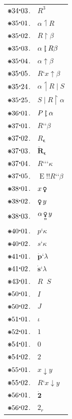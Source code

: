 \documentclass[12pt,openany,leqno,twocolumn]{book}
\newcommand{\pmast}{\text{\resizebox{!}{.75\height}{\ding{107}}}} %
\newcommand{\pmcdot}{\text{\raisebox{.05cm}{$\boldsymbol\cdot$}}} %
\newcommand{\pmbreve}[1]{\mathbf{\breve{\text{$#1$}}}}
\newcommand{\pmcirc}[1]{\mathbf{\dot{\text{$#1$}}}}
\newcommand{\pmshr}{\textbf{!}} %
\newcommand{\pmcin}{\mathop{\boldsymbol{\epsilon}}} %
\newcommand{\pmdscf}[2]{#1\textbf{`}#2} %
\newcommand{\pmcrel}[1]{\pmbreve{#1}} %
\newcommand{\pmrprd}[2]{{#1}\mathop{|}{#2}} %
\newcommand{\pmrprdn}[2]{#1^{#2}} %
\newcommand{\pmrld}[2]{#1 \boldsymbol{\upharpoonleft} #2} %
\newcommand{\pmrlcd}[2]{#1 \boldsymbol{\upharpoonright} #2} %
\newcommand{\pmrl}[2]{#1 \boldsymbol{\uparrow} #2} %
\newcommand{\pmrlf}[2]{#1 \mathbin{\ooalign{$\upharpoonright$\cr\hidewidth\rotatebox[origin=c]{180}{\text{$\upharpoonleft$}}\hidewidth\cr}} #2} %
\newcommand{\pmdscff}[2]{#1\textbf{`}\textbf{`}#2} %
\newcommand{\pmdscfR}[1]{#1_{\pmcin}}
\newcommand{\pmdscfff}[2]{#1\textbf{`}\textbf{`}\textbf{`}#2} %
\newcommand{\pmdscfe}[2]{\mathop{\text{E}}\mathop{\pmshr\pmshr}\pmdscff{#1}{#2}} %
\newcommand{\Female}{{\usefont{U}{mvs}{m}{n}\symbol{126}}} %
\newcommand{\pmop}{\mathop{\text{\Female}}} %
\newcommand{\pmopc}[2]{#1 \mathop{\underset{\textbf{''}}{\text{\Female}}} #2} %
\newcommand{\pmccprd}[1]{p\textbf{`}#1} %
\newcommand{\pmccsum}[1]{s\textbf{`}#1} %
\newcommand{\pmcrprd}[1]{\pmcirc{p}\textbf{`}#1} %
\newcommand{\pmcrsum}[1]{\pmcirc{s}\textbf{`}#1} %
\newcommand{\pmrprdd}[2]{{#1}\mathop{||}{#2}} %
\newcommand{\pmrid}{I} %
\newcommand{\pmrdiv}{J} %
\newcommand{\pmcUnit}{\iota}
\newcommand{\pmcn}[1]{#1} %
\newcommand{\pmoc}[2]{#1 \boldsymbol{\downarrow} #2} %
\newcommand{\pmdn}[1]{\pmcirc{#1}} %
\newcommand{\pmorn}[1]{#1_r} %
\begin{document}
\begin{tabular}{l l}
$\pmast34\pmcdot03$. & $\pmrprdn{R}{3}$ \\
$\pmast35\pmcdot01$. & $\pmrld{\alpha}{R}$ \\
$\pmast35\pmcdot02$. & $\pmrlcd{R}{\beta}$ \\
$\pmast35\pmcdot03$. & $\pmrlf{\alpha}{R}{\beta}$ \\
$\pmast35\pmcdot04$. & $\pmrl{\alpha}{\beta}$ \\
$\pmast35\pmcdot05$. & $\pmrl{\pmdscf{R}{x}}{\beta}$ \\
$\pmast35\pmcdot24$. & $\pmrld{\alpha}{\pmrprd{R}{S}}$ \\
$\pmast35\pmcdot25$. & $\pmrlcd{\pmrprd{S}{R}}{\alpha}$ \\
$\pmast36\pmcdot01$. & $\pmrlf{P}{\alpha}$ \\
$\pmast37\pmcdot01$. & $\pmdscff{R}{\beta}$ \\
$\pmast37\pmcdot02$. & $\pmdscfR{R}$ \\
$\pmast37\pmcdot03$. & ${\pmdscfR{\pmcrel{R}}}$\\
$\pmast37\pmcdot04$. & $\pmdscfff{R}{\kappa}$ \\
$\pmast37\pmcdot05$. & $\pmdscfe{R}{\beta}$ \\
$\pmast38\pmcdot01$. & $x \pmop$ \\
$\pmast38\pmcdot02$. & $\pmop y$ \\
$\pmast38\pmcdot03$. & $\pmopc{\alpha}{y}$\\
$\pmast40\pmcdot01$. & $\pmccprd{\kappa}$ \\
$\pmast40\pmcdot02$. & $\pmccsum{\kappa}$ \\
$\pmast41\pmcdot01$. & $\pmcrprd{\lambda}$ \\
$\pmast41\pmcdot02$. & $\pmcrsum{\lambda}$ \\
$\pmast43\pmcdot01$. & $\pmrprdd{R}{S}$ \\
$\pmast50\pmcdot01$. & $\pmrid$ \\
$\pmast50\pmcdot02$. & $\pmrdiv$ \\
$\pmast51\pmcdot01$. & $\pmcUnit$ \\
$\pmast52\pmcdot01$. & $\pmcn{1}$ \\
$\pmast54\pmcdot01$. & $\pmcn{0}$ \\
$\pmast54\pmcdot02$. & $\pmcn{2}$ \\
$\pmast55\pmcdot01$. & $\pmoc{x}{y}$ \\
$\pmast55\pmcdot02$. & $\pmoc{\pmdscf{R}{x}}{y}$ \\
$\pmast56\pmcdot01$. & $\pmdn{2}$ \\
$\pmast56\pmcdot02$. & $\pmorn{2}$ 
\end{tabular}
\end{document}
